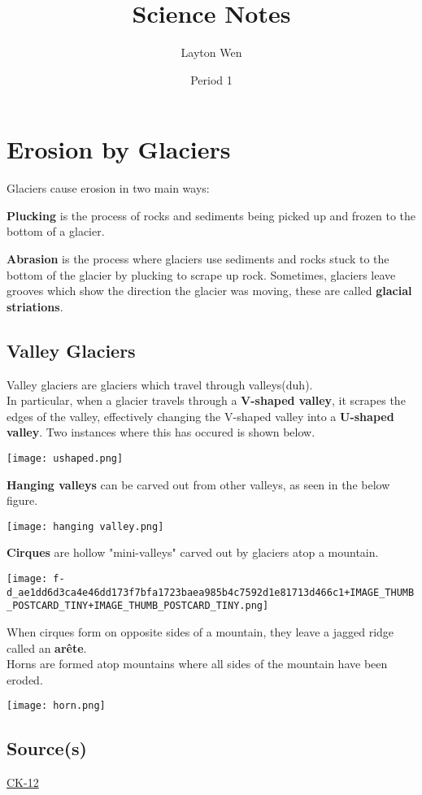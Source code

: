 \documentclass{article}
\title{Science Notes}
\author{Layton Wen}
\date{Period 1}
\begin{document}
\maketitle
\toc
\clearpage
\section{Erosion by Glaciers}
Glaciers cause erosion in two main ways:
\begin{definition}[Plucking]
\textbf{Plucking} is the process of rocks and sediments being picked up and frozen to the bottom of a glacier.
\end{definition}
\begin{definition}[Abrasion]
\textbf{Abrasion} is the process where glaciers use sediments and rocks stuck to the bottom of the glacier by plucking to scrape up rock. Sometimes, glaciers leave grooves which show the direction the glacier was moving, these are called \textbf{glacial striations}.
\end{definition}
\subsection{Valley Glaciers}
Valley glaciers are glaciers which travel through valleys(duh).\\[5pt] In particular, when a glacier travels through a \textbf{V-shaped valley}, it scrapes the edges of the valley, effectively changing the V-shaped valley into a \textbf{U-shaped valley}. Two instances where this has occured is shown below.
\begin{center}
    \texttt{[image: ushaped.png]}
\end{center}
\textbf{Hanging valleys} can be carved out from other valleys, as seen in the below figure.
\begin{center}
    \texttt{[image: hanging valley.png]}
\end{center}
\textbf{Cirques} are hollow "mini-valleys" carved out by glaciers atop a mountain. 
\begin{center}
    \texttt{[image: f-d\_ae1dd6d3ca4e46dd173f7bfa1723baea985b4c7592d1e81713d466c1+IMAGE\_THUMB\_POSTCARD\_TINY+IMAGE\_THUMB\_POSTCARD\_TINY.png]}
\end{center}
When cirques form on opposite sides of a mountain, they leave a jagged ridge called an \textbf{arête}.\\[5pt]
Horns are formed atop mountains where all sides of the mountain have been eroded.
\begin{center}
    \texttt{[image: horn.png]}
\end{center}
\subsection{Source(s)}
\href{https://flexbooks.ck12.org/cbook/ck-12-middle-school-earth-science-flexbook-2.0/section/14.10/primary/lesson/erosion-by-glaciers-ms-es}{CK-12}
\end{document}

